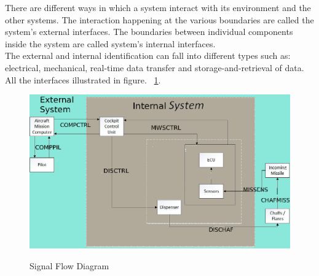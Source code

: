 There are different ways in which a system interact with its environment and the other systems. The interaction happening at the various boundaries are called the system's external interfaces. The boundaries between individual components inside the system are called system's internal interfaces.\\
The external and internal identification can fall into different types such as: electrical, mechanical, real-time data transfer and storage-and-retrieval of data. All the interfaces illustrated in figure. ~\ref{fig:sigFlowDiagram}.
\begin{figure}[h]
	\centering
	\includegraphics[scale=0.5]{./images/SignalFlowDiagramDDD_v2}\\
	\caption{Signal Flow Diagram}
    \label{fig:sigFlowDiagram}
\end{figure}

